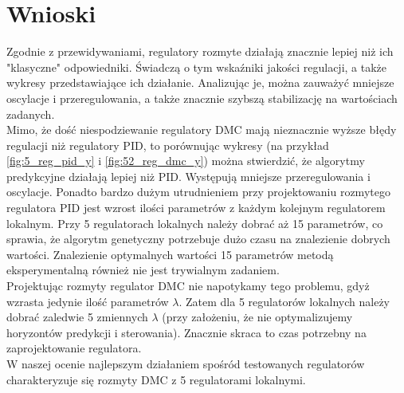\section{Wnioski}
Zgodnie z przewidywaniami, regulatory rozmyte działają znacznie lepiej niż ich "klasyczne" odpowiedniki. Świadczą o tym wskaźniki jakości regulacji, a także wykresy przedstawiające ich działanie. Analizując je, można zauważyć mniejsze oscylacje i przeregulowania, a także znacznie szybszą stabilizację na wartościach zadanych.\\
Mimo, że dość niespodziewanie regulatory DMC mają nieznacznie wyższe błędy regulacji niż regulatory PID, to porównując wykresy (na przykład \ref{fig:5_reg_pid_y} i \ref{fig:52_reg_dmc_y}) można stwierdzić, że algorytmy predykcyjne działają lepiej niż PID. Występują mniejsze przeregulowania i oscylacje. Ponadto bardzo dużym utrudnieniem przy projektowaniu rozmytego regulatora PID jest wzrost ilości parametrów z każdym kolejnym regulatorem lokalnym. Przy 5 regulatorach lokalnych należy dobrać aż 15 parametrów, co sprawia, że algorytm genetyczny potrzebuje dużo czasu na znalezienie dobrych wartości. Znalezienie optymalnych wartości 15 parametrów metodą eksperymentalną również nie jest trywialnym zadaniem. \\Projektując rozmyty regulator DMC nie napotykamy tego problemu, gdyż wzrasta jedynie ilość parametrów $\lambda$. Zatem dla 5 regulatorów lokalnych należy dobrać zaledwie 5 zmiennych $\lambda$ (przy założeniu, że nie optymalizujemy horyzontów predykcji i sterowania). Znacznie skraca to czas potrzebny na zaprojektowanie regulatora.
\\
W naszej ocenie najlepszym działaniem spośród testowanych regulatorów charakteryzuje się rozmyty DMC z 5 regulatorami lokalnymi.